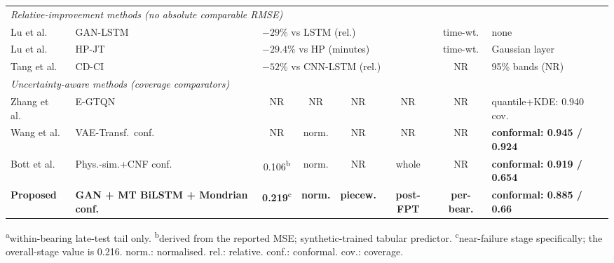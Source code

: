 \begin{table}[!htbp]
\begin{tabular}{llcccccl}
\midrule
\multicolumn{8}{l}{\textit{Relative-improvement methods (no absolute comparable RMSE)}}\\
Lu et al.~\cite{9486650}             & GAN-LSTM             & \multicolumn{4}{l}{$-29\%$ vs LSTM (rel.)}       & time-wt. & none \\
Lu et al.~\cite{lu_joint_2022}       & HP-JT                & \multicolumn{4}{l}{$-29.4\%$ vs HP (minutes)}    & time-wt. & Gaussian layer \\
Tang et al.~\cite{10555355}          & CD-CI                & \multicolumn{4}{l}{$-52\%$ vs CNN-LSTM (rel.)}   & NR & 95\% bands (NR) \\
\midrule
\multicolumn{8}{l}{\textit{Uncertainty-aware methods (coverage comparators)}}\\
Zhang et al.~\cite{zhang_explainable_2025}     & E-GTQN      & NR & NR & NR & NR & NR & quantile+KDE: 0.940 cov. \\
Wang et al.~\cite{wang_uncertainty-aware_2026} & VAE-Transf.\ conf. & NR & norm. & NR & NR & NR & \textbf{conformal: 0.945 / 0.924} \\
Bott et al.~\cite{11373138}          & Phys.-sim.+CNF conf. & 0.106\textsuperscript{b} & norm. & NR & whole & NR & \textbf{conformal: 0.919 / 0.654} \\
\midrule
\rowcolor[RGB]{198,224,180}
\textbf{Proposed} & \textbf{GAN + MT BiLSTM + Mondrian conf.} &
\textbf{0.219}\textsuperscript{c} & \textbf{norm.} & \textbf{piecew.} &
\textbf{post-FPT} & \textbf{per-bear.} & \textbf{conformal: 0.885 / 0.66} \\
\bottomrule
\end{tabular}

\vspace{3pt}
\raggedright\scriptsize
\textsuperscript{a}within-bearing late-test tail only.
\textsuperscript{b}derived from the reported MSE; synthetic-trained tabular predictor.
\textsuperscript{c}near-failure stage specifically; the overall-stage value is 0.216.
norm.: normalised. rel.: relative. conf.: conformal. cov.: coverage.
\end{table}
